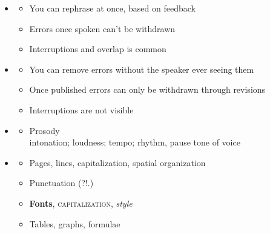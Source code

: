 \documentclass[a4paper,landscape,headrule,footrule,xetex]{foils}
\begin{document}

\begin{itemize}
\item {}

\begin{itemize}
\item You can rephrase at once, based on feedback
\item Errors once spoken can't be withdrawn
\item Interruptions and overlap is common
\end{itemize}
\item {}
\begin{itemize}
\item You can remove errors without the speaker ever seeing them
\item Once published errors can only be withdrawn through revisions
\item Interruptions are not visible
\end{itemize}
\end{itemize}



\begin{itemize}
\item {}

\begin{itemize}
\item Prosody
\\ intonation; loudness; tempo; rhythm, pause tone of voice
\end{itemize}
\item {}
\begin{itemize}
\item Pages, lines, capitalization, spatial organization
\item Punctuation (?!.)
\item \textbf{Fonts}, \textsc{capitalization}, \textit{style} 
\item Tables, graphs, formulae
\end{itemize}
\end{itemize}



\end{document}
